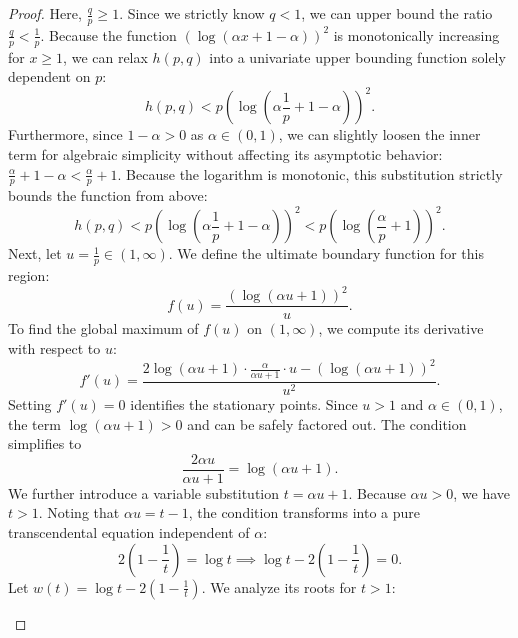 \documentclass{article}
\theoremstyle{plain}
\theoremstyle{definition}
\theoremstyle{remark}
\begin{document}
\begin{proof}
	Here, $\frac{q}{p} \geq 1$. Since we strictly know $q < 1$, we can upper bound the ratio $\frac{q}{p} < \frac{1}{p}$. Because the function $(\log(\alpha x + 1 - \alpha))^2$ is monotonically increasing for $x \geq 1$, we can relax $h(p, q)$ into a univariate upper bounding function solely dependent on $p$:
	\begin{equation}
		h(p, q) < p \left( \log\left(\alpha \frac{1}{p} + 1 - \alpha\right) \right)^2.
	\end{equation}
	Furthermore, since $1 - \alpha > 0$ as $\alpha \in (0, 1)$, we can slightly loosen the inner term for algebraic simplicity without affecting its asymptotic behavior: $\frac{\alpha}{p} + 1 - \alpha < \frac{\alpha}{p} + 1$. Because the logarithm is monotonic, this substitution strictly bounds the function from above:
	\begin{equation}
		h(p, q) < p \left( \log\left(\alpha \frac{1}{p} + 1 - \alpha\right) \right)^2<p \left( \log\left(\frac{\alpha}{p} + 1\right) \right)^2.
	\end{equation}
	Next, let $u = \frac{1}{p}\in (1, \infty)$. We define the ultimate boundary function for this region:
	\begin{equation}
		f(u) = \frac{\left(\log(\alpha u + 1)\right)^2}{u}.
	\end{equation}
	To find the global maximum of $f(u)$ on $(1, \infty)$, we compute its derivative with respect to $u$:
	\begin{equation}
		f'(u) = \frac{2 \log(\alpha u + 1) \cdot \frac{\alpha}{\alpha u + 1} \cdot u - \left(\log(\alpha u + 1)\right)^2}{u^2}.
	\end{equation}
	Setting $f'(u) = 0$ identifies the stationary points. Since $u > 1$ and $\alpha \in (0, 1)$, the term $\log(\alpha u + 1) > 0$ and can be safely factored out. The condition simplifies to
	\begin{equation}
		\frac{2\alpha u}{\alpha u + 1} = \log(\alpha u + 1).
	\end{equation}
	We further introduce a variable substitution $t = \alpha u + 1$. Because $\alpha u > 0$, we have $t > 1$. Noting that $\alpha u = t - 1$, the condition transforms into a pure transcendental equation independent of $\alpha$:
	\begin{equation}
		2\left(1-\frac{1}{t}\right) = \log t \implies \log t - 2\left(1 - \frac{1}{t}\right) = 0.
	\end{equation}
	Let $w(t) = \log t - 2\left(1 - \frac{1}{t}\right)$. We analyze its roots for $t > 1$:
	\begin{enumerate}

\end{enumerate}
\end{proof}
\end{document}
